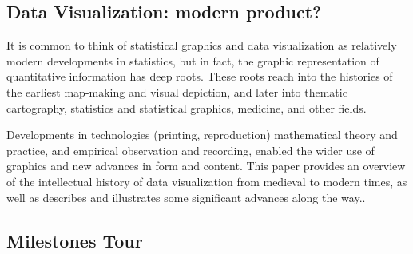 \documentclass[]{book}
\theoremstyle{definition}
\theoremstyle{definition}
\theoremstyle{definition}
\theoremstyle{remark}
\begin{document}
\subsection{Data Visualization: modern
product?}\label{data-visualization-modern-product}

It is common to think of statistical graphics and data visualization as
relatively modern developments in statistics, but in fact, the graphic
representation of quantitative information has deep roots. These roots
reach into the histories of the earliest map-making and visual
depiction, and later into thematic cartography, statistics and
statistical graphics, medicine, and other fields.

Developments in technologies (printing, reproduction) mathematical
theory and practice, and empirical observation and recording, enabled
the wider use of graphics and new advances in form and content. This
paper provides an overview of the intellectual history of data
visualization from medieval to modern times, as well as describes and
illustrates some significant advances along the
way.\citep{data_viz_history}.

\subsection{\texorpdfstring{Milestones Tour
\citep{data_viz_history}}{Milestones Tour {[}@data\_viz\_history{]}}}\label{milestones-tour-data_viz_history}
\end{document}
